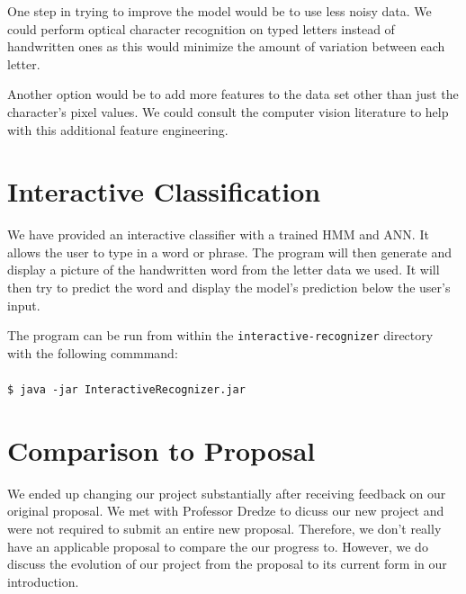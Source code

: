\documentclass[11pt,a4paper,twocolumn]{article}
\begin{document}
One step in trying to improve the model would be to use less noisy data. We could perform optical
character recognition on typed letters instead of handwritten ones as this would minimize the amount
of variation between each letter.

Another option would be to add more features to the data set other than just the character's pixel
values. We could consult the computer vision literature to help with this additional feature
engineering.






\newpage
\appendix
\section{Interactive Classification}

We have provided an interactive classifier with a trained HMM and ANN\@. It allows the user
to type in a word or phrase. The program will then generate and display a picture of the handwritten
word from the letter data we used. It will then try to predict the word and display the model's
prediction below the user's input.

The program can be run from within the \texttt{interactive-recognizer}
directory with the following commmand:\\\\
\texttt{\$ java -jar InteractiveRecognizer.jar}

\section{Comparison to Proposal}
We ended up changing our project substantially after receiving feedback on our original proposal. We
met with Professor Dredze to dicuss our new project and were not required to submit an entire new
proposal. Therefore, we don't really have an applicable proposal to compare the our progress to.
However, we do discuss the evolution of our project from the proposal to its current form
in our introduction.
\end{document}
